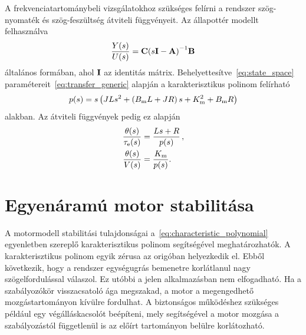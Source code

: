 A frekvenciatartománybeli vizsgálatokhoz szükséges felírni a rendszer 
szög-nyomaték és szög-feszültség átviteli függvényeit. Az állapottér modellt felhasználva
\begin{align}\label{eq:transfer_generic}
    \frac{Y(s)}{U(s)} = \mathbf{C}{\left(s \mathbf{I} - \mathbf{A}\right)}^{-1} \mathbf{B}
\end{align}
általános formában, ahol $\mathbf{I}$ az identitás mátrix. Behelyettesítve~\eqref{eq:state_space} 
paramétereit~\eqref{eq:transfer_generic} alapján a karakterisztikus polinom felírható
\begin{align}\label{eq:characteristic_polynomial}
    p(s) = s\left(JLs^2 + \left(B_{\mathrm{m}} L + JR\right)s + K_{\mathrm{m}}^2 + B_{\mathrm{m}} R\right)
\end{align}
alakban. Az átviteli függvények pedig ez alapján
\begin{equation}\label{eq:transfer_function}
    \begin{split}
        \frac{\theta(s)}{\tau_{\mathrm{e}}(s)} &= \frac{Ls + R}{p(s)}\,,\\
        \frac{\theta(s)}{V(s)} &= \frac{K_{\mathrm{m}}}{p(s)}.
    \end{split}
\end{equation}

\section{Egyenáramú motor stabilitása}
A motormodell stabilitási tulajdonságai a~\eqref{eq:characteristic_polynomial} egyenletben szereplő karakterisztikus 
polinom segítségével meghatározhatók.
A karakterisztikus polinom egyik zérusa az origóban helyezkedik el. Ebből következik, hogy a rendszer
egységugrás bemenetre korlátlanul nagy szögelfordulással válaszol. Ez utóbbi a jelen alkalmazásban nem elfogadható. 
Ha a szabályozókör visszacsatoló ága megszakad, a motor a megengedhető mozgástartományon kívülre fordulhat.
A biztonságos működéshez szükséges például egy végálláskacsolót beépíteni, mely segítségével a motor 
mozgása a szabályozástól függetlenül is az előírt tartományon belülre korlátozható.

